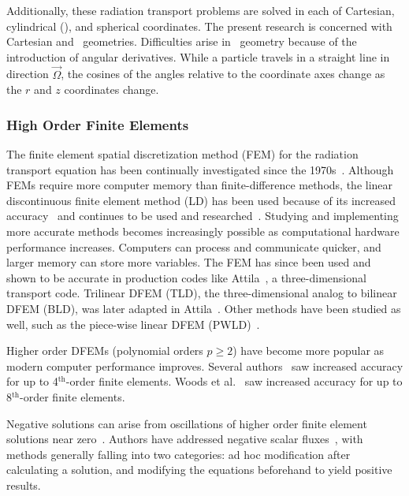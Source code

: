 \documentclass{article}
\begin{document}
Additionally, these radiation transport problems are solved in each of Cartesian, cylindrical (\RZ), and spherical coordinates. The present research is concerned with Cartesian and \RZ\ geometries. Difficulties arise in \RZ\ geometry because of the introduction of angular derivatives. While a particle travels in a straight line in direction $\vec{\Omega}$, the cosines of the angles relative to the coordinate axes change as the $r$ and $z$ coordinates change.

\subsubsection{High Order Finite Elements}

The finite element spatial discretization method (FEM) for the radiation transport equation has been continually investigated since the 1970s~\cite{ReedTriangularMesh, LasaintFEM}. Although FEMs require more computer memory than finite-difference methods, the linear discontinuous finite element method (LD) has been used because of its increased accuracy~\cite{LarsenAsymptotic} and continues to be used and researched~\cite{LarsenConvergenceRates, HamiltonNegativeFluxFixups, Adams_Disc_FEM_Thick_Diff}. Studying and implementing more accurate methods becomes increasingly possible as computational hardware performance increases. Computers can process and communicate quicker, and larger memory can store more variables. The FEM has since been used and shown to be accurate in production codes like Attila~\cite{WareingAttila}, a three-dimensional transport code. Trilinear DFEM (TLD), the three-dimensional analog to bilinear DFEM (BLD), was later adapted in Attila~\cite{AttilaUsersManual}. Other methods have been studied as well, such as the piece-wise linear DFEM (PWLD)~\cite{BaileyDFEMCylindrical}.

Higher order DFEMs (polynomial orders $p \geq 2$) have become more popular as modern computer performance improves. Several authors~\cite{WangRagusaDSA, WangHODGTransport, WangDGFEMConvergence, WangDissertation} saw increased accuracy for up to 4$^\text{th}$-order finite elements. Woods et al.~\cite{WoodsHoDgfemXyCurved} saw increased accuracy for up to 8$^\text{th}$-order finite elements.

Negative solutions can arise from oscillations of higher order finite element solutions near zero~\cite{WoodsThesis,WoodsHoDgfemXyCurved}. Authors have addressed negative scalar fluxes~\cite{HamiltonNegativeFluxFixups, Adams_Disc_FEM_Thick_Diff, MaginotNonNegative, MaginotLumpingDFEM, BrunnerPreservingPositivity}, with methods generally falling into two categories: ad hoc modification after calculating a solution, and modifying the equations beforehand to yield positive results.
\end{document}
